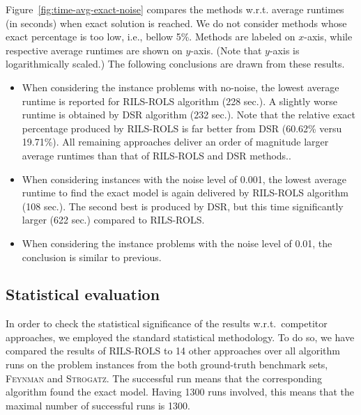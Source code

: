 \documentclass{bmcart}
\begin{document}
Figure~\ref{fig:time-avg-exact-noise} compares the methods w.r.t. average runtimes (in seconds) when exact solution is reached. We do not consider methods whose exact percentage is too low, i.e., bellow 5\%. Methods are labeled on $x$-axis, while respective average runtimes are shown on $y$-axis. (Note that $y$-axis is logarithmically scaled.) The following conclusions are drawn from these results.

\begin{itemize}
	\item When considering the instance problems with no-noise, the lowest average runtime is reported for \textsc{RILS}-\textsc{ROLS} algorithm (228 sec.). A slightly worse runtime is obtained by \textsc{DSR} algorithm (232 sec.). Note that the relative exact percentage produced by \textsc{RILS}-\textsc{ROLS} is far better from \textsc{DSR} (60.62\% versu 19.71\%). All remaining approaches deliver an order of magnitude larger average runtimes than that of \textsc{RILS}-\textsc{ROLS} and \textsc{DSR} methods..   
	\item  When considering instances with the noise level of 0.001, the lowest average runtime to find the exact model is again delivered by \textsc{RILS}-\textsc{ROLS} algorithm (108 sec.). The second best is produced by \textsc{DSR}, but this time significantly larger (622 sec.) compared to \textsc{RILS-ROLS}. 
	\item When considering the instance problems with the noise level of 0.01, the conclusion is similar to previous. 
\end{itemize}

\subsection{Statistical evaluation}

In order to check the statistical significance of the results w.r.t.\ competitor approaches, we employed the standard statistical methodology. To do so, we have compared the results of \textsc{RILS}-\textsc{ROLS} to 14 other approaches over all algorithm runs on the problem instances from the both ground-truth benchmark sets, \textsc{Feynman} and \textsc{Strogatz}. The successful run means that the corresponding algorithm found the exact model. Having 1300 runs involved, this means that the maximal number of successful runs is 1300. 
\end{document}
